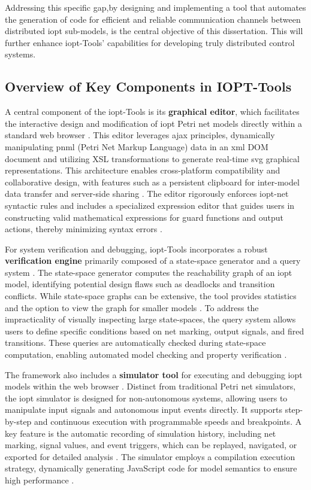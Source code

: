 Addressing this specific gap,by designing and implementing a tool that automates the generation of code for efficient and reliable communication channels between distributed \gls{iopt} sub-models, is the central objective of this dissertation. This will further enhance \gls{iopt}-Tools' capabilities for developing truly distributed control systems.


\subsection{Overview of Key Components in IOPT-Tools}
\label{sub:iopt_tools_components}

A central component of the \gls{iopt}-Tools is its \textbf{graphical editor}, which facilitates the interactive design and modification of \gls{iopt} Petri net models directly within a standard web browser \cite{apresentacao}. This editor leverages \gls{ajax} principles, dynamically manipulating \gls{pnml} (Petri Net Markup Language) data in an \gls{xml} DOM document and utilizing XSL transformations to generate real-time \gls{svg} graphical representations. This architecture enables cross-platform compatibility and collaborative design, with features such as a persistent clipboard for inter-model data transfer and server-side sharing \cite{apresentacao}. The editor rigorously enforces \gls{iopt}-net syntactic rules and includes a specialized expression editor that guides users in constructing valid mathematical expressions for guard functions and output actions, thereby minimizing syntax errors \cite{apresentacao}.

For system verification and debugging, \gls{iopt}-Tools incorporates a robust \textbf{verification engine} primarily composed of a state-space generator and a query system \cite{manual, 2015gomes}. The state-space generator computes the reachability graph of an \gls{iopt} model, identifying potential design flaws such as deadlocks and transition conflicts. While state-space graphs can be extensive, the tool provides statistics and the option to view the graph for smaller models \cite{vhld}. To address the impracticality of visually inspecting large state-spaces, the query system allows users to define specific conditions based on net marking, output signals, and fired transitions. These queries are automatically checked during state-space computation, enabling automated model checking and property verification \cite{2015gomes}.

The framework also includes a \textbf{simulator tool} for executing and debugging \gls{iopt} models within the web browser \cite{2015gomes}. Distinct from traditional Petri net simulators, the \gls{iopt} simulator is designed for non-autonomous systems, allowing users to manipulate input signals and autonomous input events directly. It supports step-by-step and continuous execution with programmable speeds and breakpoints. A key feature is the automatic recording of simulation history, including net marking, signal values, and event triggers, which can be replayed, navigated, or exported for detailed analysis \cite{2015gomes}. The simulator employs a compilation execution strategy, dynamically generating JavaScript code for model semantics to ensure high performance \cite{2015gomes}.

